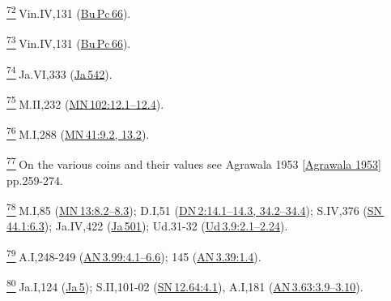 \label{footprints_split_024.html_fn72}
\hyperref[footprints_split_006.htmlux5cux23fnref72]{\textsuperscript{72}} Vin.IV,131
(\href{https://suttacentral.net/pli-tv-bu-vb-pc66/en/brahmali}{Bu\,Pc\,66}).

\label{footprints_split_024.html_fn73}
\hyperref[footprints_split_006.htmlux5cux23fnref73]{\textsuperscript{73}} Vin.IV,131
(\href{https://suttacentral.net/pli-tv-bu-vb-pc66/en/brahmali}{Bu\,Pc\,66}).

\label{footprints_split_024.html_fn74}
\hyperref[footprints_split_006.htmlux5cux23fnref74]{\textsuperscript{74}} Ja.VI,333
(\href{https://suttacentral.net/ja542}{Ja\,542}).

\label{footprints_split_024.html_fn75}
\hyperref[footprints_split_006.htmlux5cux23fnref75]{\textsuperscript{75}} M.II,232
(\href{https://suttacentral.net/mn102/en/sujato\#12.1}{MN\,102:12.1--12.4}).

\label{footprints_split_024.html_fn76}
\hyperref[footprints_split_006.htmlux5cux23fnref76]{\textsuperscript{76}} M.I,288
(\href{https://suttacentral.net/mn41/en/sujato\#9.2}{MN\,41:9.2, 13.2}).

\label{footprints_split_024.html_fn77}
\hyperref[footprints_split_006.htmlux5cux23fnref77]{\textsuperscript{77}} On
the various coins and their values see {Agrawala 1953
{{[}\hyperref[footprints_split_022.htmlux5cux23Agrawalaux5cux25201953]{Agrawala
1953}{]}}} pp.259-274.

\label{footprints_split_024.html_fn78}
\hyperref[footprints_split_006.htmlux5cux23fnref78]{\textsuperscript{78}} M.I,85
(\href{https://suttacentral.net/mn13/en/sujato\#8.2}{MN\,13:8.2--8.3});
D.I,51
(\href{https://suttacentral.net/dn2/en/sujato\#14.1}{DN\,2:14.1--14.3,
34.2--34.4}); S.IV,376
(\href{https://suttacentral.net/sn44.1/en/sujato\#6.3}{SN\,44.1:6.3});
Ja.IV,422 (\href{https://suttacentral.net/ja501}{Ja\,501}); Ud.31-32
(\href{https://suttacentral.net/ud3.9/en/sujato\#2.1}{Ud\,3.9:2.1--2.24}).

\label{footprints_split_024.html_fn79}
\hyperref[footprints_split_006.htmlux5cux23fnref79]{\textsuperscript{79}} A.I,248-249
(\href{https://suttacentral.net/an3.99/en/sujato\#4.1}{AN\,3.99:4.1--6.6});
145
(\href{https://suttacentral.net/an3.39/en/sujato\#1.4}{AN\,3.39:1.4}).

\label{footprints_split_024.html_fn80}
\hyperref[footprints_split_006.htmlux5cux23fnref80]{\textsuperscript{80}} Ja.I,124
(\href{https://suttacentral.net/ja5}{Ja\,5}); S.II,101-02
(\href{https://suttacentral.net/sn12.64/en/sujato\#4.1}{SN\,12.64:4.1}),
A.I,181
(\href{https://suttacentral.net/an3.63/en/sujato\#3.9}{AN\,3.63:3.9--3.10}).

